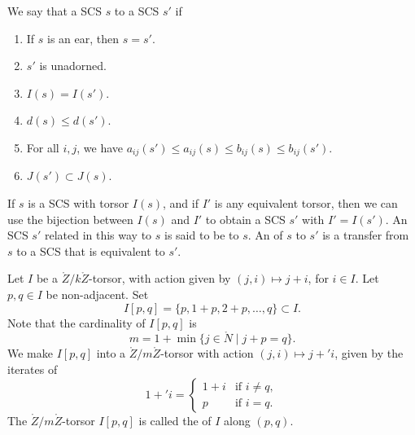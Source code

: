 \begin{definition}  
We say that a SCS $s$
 to a SCS $s'$ if
\begin{enumerate}
\item If $s$ is an ear, then $s=s'$.
\item $s'$ is unadorned.
\item $I(s) = I(s')$.
\item $d(s)\le d(s')$.
\item For all $i,j$, we have $a_{ij}(s')\le a_{ij}(s)\le b_{ij}(s)\le b_{ij}(s')$.
\item $J(s')\subset J(s)$.
\end{enumerate}
\end{definition}

\begin{definition}
If $s$ is a SCS with torsor $I(s)$, and if
$I'$ is any equivalent torsor, then we can use the bijection between $I(s)$ and $I'$
to obtain a SCS $s'$ with $I' = I(s')$.  An
SCS $s'$ related in this way to $s$ is said
to be  to $s$.  An  of $s$
to $s'$ is a transfer from $s$ to a SCS that
is equivalent to $s'$.
\end{definition}

\begin{definition} 
Let $I$ be a $\ring{Z}/k\ring{Z}$-torsor, with action given by $(j,i)\mapsto j+i$,
for $i\in I$.  Let $p,q\in I$ be non-adjacent.  Set
\[
I[p,q] = \{p,1+p,2+p,\ldots,q\} \subset I.
\]
Note that the cardinality of $I[p,q]$ is
\[
m = 1 + \min \{j\in \ring{N} \mid j + p = q\}.
\]
We make $I[p,q]$ into a $\ring{Z}/m\ring{Z}$-torsor with action $(j,i)\mapsto j+' i$,
given by the iterates of
\[
1 +' i = 
\begin{cases}
  1 + i &\text{if } i\ne q,\\
  p &\text{if } i = q.
\end{cases}
\]
The $\ring{Z}/m\ring{Z}$-torsor $I[p,q]$ is called the
 of $I$ along $(p,q)$.
%
\end{definition}

\figWKUYEXM %


